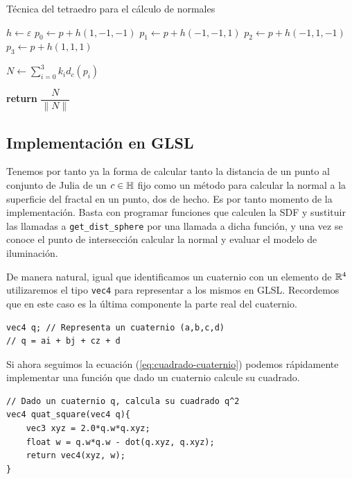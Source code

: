 \begin{algorithm}[H]
    \caption{Técnica del tetraedro para el cálculo de normales} \label{alg:normal-tetraedro}
    \begin{algorithmic}
    \State $h\gets\varepsilon$
    \State $p_0 \gets p + h(1,-1,-1)$
    \State $p_1 \gets p + h(-1,-1,1)$
    \State $p_2 \gets p + h(-1,1,-1)$
    \State $p_3 \gets p + h(1,1,1)$

    \State $N\gets \sum_{i=0}^3 k_i d_c(p_i)$

    \State \textbf{return} $\dfrac{N}{\|N\|}$
    \EndProcedure
    \end{algorithmic}
\end{algorithm}

\subsection{Implementación en GLSL}

Tenemos por tanto ya la forma de calcular tanto la distancia de un punto al conjunto de Julia de un $c\in\mathbb{H}$ fijo como un método para calcular la normal a la superficie del fractal en un punto, dos de hecho. Es por tanto momento de la implementación. Basta con programar funciones que calculen la SDF y sustituir las llamadas a \verb|get_dist_sphere| por una llamada a dicha función, y una vez se conoce el punto de intersección calcular la normal y evaluar el modelo de iluminación.

De manera natural, igual que identificamos un cuaternio con un elemento de $\mathbb{R}^4$ utilizaremos el tipo \verb|vec4| para representar a los mismos en GLSL. Recordemos que en este caso es la última componente la parte real del cuaternio.

\begin{lstlisting}
vec4 q; // Representa un cuaternio (a,b,c,d)
// q = ai + bj + cz + d
\end{lstlisting}

Si ahora seguimos la ecuación (\ref{eq:cuadrado-cuaternio}) podemos rápidamente implementar una función que dado un cuaternio calcule su cuadrado.

\begin{lstlisting}
// Dado un cuaternio q, calcula su cuadrado q^2
vec4 quat_square(vec4 q){
    vec3 xyz = 2.0*q.w*q.xyz;
    float w = q.w*q.w - dot(q.xyz, q.xyz);
    return vec4(xyz, w);
}
\end{lstlisting}

